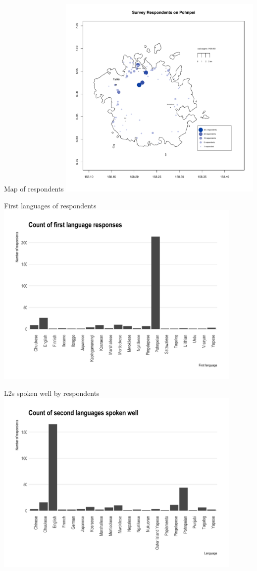\documentclass[10pt]{beamer}
\begin{document}
\begin{frame}{Map of respondents}
\includegraphics[width=0.75\textwidth]{figures/participantMap.pdf}
\end{frame}


\begin{frame}{First languages of respondents}
\includegraphics[width=0.9\textwidth]{figures/L1.png}
\end{frame}

\begin{frame}{L2s spoken well by respondents}
\includegraphics[width=0.9\textwidth]{figures/L2well.png}
\end{frame}
\end{document}
